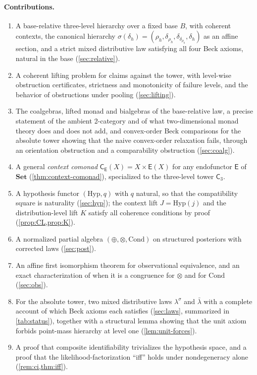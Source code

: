\documentclass[11pt]{article}
\theoremstyle{definition}
\theoremstyle{remark}
\newcommand{\Set}{\mathbf{Set}}
\newcommand{\Hyp}{\mathrm{Hyp}}
\newcommand{\Cond}{\mathrm{Cond}}
\newcommand{\C}{\mathsf{C}}
\newcommand{\E}{\mathsf{E}}
\newcommand{\lb}{\bar\lambda}
\newcommand{\ls}{\lambda^{\sigma}}
\begin{document}
\paragraph{Contributions.}
\begin{enumerate}[leftmargin=*]
\item A base-relative three-level hierarchy over a fixed base $B$, with coherent contexts, the
  canonical hierarchy $\sigma(\delta_h)=(\rho_h,\delta_{\rho_h},\delta_{\delta_{\rho_h}},\delta_h)$ as an
  affine section, and a strict mixed distributive law satisfying all four Beck axioms, natural in the
  base (\cref{sec:relative}).
\item A coherent lifting problem for claims against the tower, with level-wise obstruction
  certificates, strictness and monotonicity of failure levels, and the behavior of obstructions under
  pooling (\cref{sec:lifting}).
\item The coalgebras, lifted monad and bialgebras of the base-relative law, a precise statement of
  the ambient 2-category and of what two-dimensional monad theory does and does not add, and
  convex-order Beck comparisons for the absolute tower showing that the naive convex-order
  relaxation fails, through an orientation obstruction and a comparability obstruction
  (\cref{sec:coalg}).
\item A general \emph{context comonad} $\C_\E(X)=X\times\E(X)$ for any endofunctor $\E$ of $\Set$
  (\cref{thm:context-comonad}), specialized to the three-level tower $\C_3$.
\item A hypothesis functor $(\Hyp,q)$ with $q$ natural, so that the compatibility square is
  naturality (\cref{sec:hyp}); the context lift $J=\Hyp(j)$ and the distribution-level lift $K$
  satisfy all coherence conditions by proof (\cref{prop:CL,prop:K}).
\item A normalized partial algebra $(\oplus,\otimes,\Cond)$ on structured posteriors with corrected
  laws (\cref{sec:post}).
\item An affine first isomorphism theorem for observational equivalence, and an exact
  characterization of when it is a congruence for $\otimes$ and for $\Cond$ (\cref{sec:obs}).
\item For the absolute tower, two mixed distributive laws $\ls$ and $\lb$ with a complete account
  of which Beck axioms each satisfies (\cref{sec:laws}, summarized in \cref{tab:status}), together with a structural lemma
  showing that the unit axiom forbids point-mass hierarchy at level one (\cref{lem:unit-forces}).
\item A proof that composite identifiability trivializes the hypothesis space, and a proof that the
  likelihood-factorization ``iff'' holds under nondegeneracy alone (\cref{rem:ci,thm:iff}).
\end{enumerate}
\end{document}
